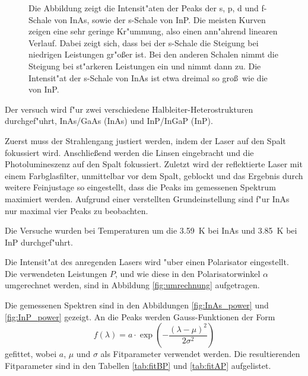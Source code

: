 \begin{figure}[htbp]
    \centering
    
    \caption{
        Die Abbildung zeigt die Intensit"aten der Peaks der s, p, d und f-Schale von InAs, sowie der s-Schale von InP.
        Die meisten Kurven zeigen eine sehr geringe Kr"ummung, also einen ann"ahrend linearen Verlauf.
        Dabei zeigt sich, dass bei der s-Schale die Steigung bei niedrigen Leistungen gr"o\ss er ist.
        Bei den anderen Schalen nimmt die Steigung bei st"arkeren Leistungen ein und nimmt dann zu.
        Die Intensit"at der s-Schale von InAs ist etwa dreimal so gro\ss\ wie die von InP.
    }
    \label{fig:overpower}
\end{figure}
Der versuch wird f"ur zwei verschiedene Halbleiter-Heterostrukturen durchgef"uhrt, InAs/GaAs (InAs) und InP/InGaP (InP).

Zuerst muss der Strahlengang justiert werden, indem der Laser auf den Spalt fokussiert wird.
Anschlie\ss end werden die Linsen eingebracht und die Photolumineszenz auf den Spalt fokussiert.
Zuletzt wird der reflektierte Laser mit einem Farbglasfilter, unmittelbar vor dem Spalt, geblockt und das Ergebnis durch weitere Feinjustage so eingestellt, dass die Peaks im gemessenen Spektrum maximiert werden.
Aufgrund einer verstellten Grundeinstellung sind f"ur InAs nur maximal vier Peaks zu beobachten.

Die Versuche wurden bei Temperaturen um die \SI{3.59}{\kelvin} bei InAs und \SI{3.85}{\kelvin} bei InP durchgef"uhrt.

Die Intensit"at des anregenden Lasers wird "uber einen Polarisator eingestellt.
Die verwendeten Leistungen $P$, und wie diese in den Polarisatorwinkel $\alpha$ umgerechnet werden, sind in Abbildung \vref{fig:umrechnung} aufgetragen.

Die gemessenen Spektren sind in den Abbildungen \vref{fig:InAs_power} und \vref{fig:InP_power} gezeigt.
An die Peaks werden Gauss-Funktionen der Form
\begin{equation}
f(\lambda)
    = a\cdot\exp(-\frac{(\lambda-\mu)^2}{2\sigma^2})
    \label{eq:fit}
\end{equation}
gefittet, wobei $a$, $\mu$ und $\sigma$ als Fitparameter verwendet werden.
Die resultierenden Fitparameter sind in den Tabellen \vref{tab:fitBP} und \vref{tab:fitAP} aufgelistet.

